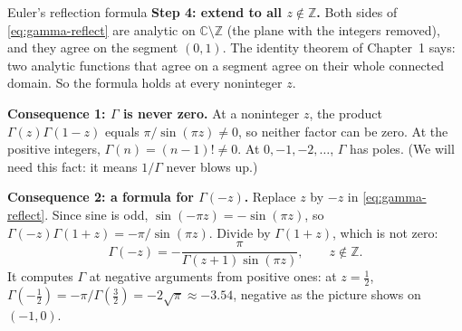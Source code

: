 \documentclass[11pt]{beamer}
\begin{document}
\begin{frame}[allowframebreaks=1.00]{Euler's reflection formula}
\textbf{Step 4: extend to all \(z\notin\mathbb Z\).} Both sides of \eqref{eq:gamma-reflect} are
analytic on \(\mathbb C\setminus\mathbb Z\) (the plane with the integers removed), and they agree
on the segment \((0,1)\). The identity theorem of Chapter~1 says: two analytic functions that
agree on a segment agree on their whole connected domain. So the formula holds at every
noninteger \(z\).
\par\framebreak\par
\textbf{Consequence 1: \(\Gamma\) is never zero.} At a noninteger \(z\), the product
\(\Gamma(z)\Gamma(1-z)\) equals \(\pi/\sin(\pi z)\neq0\), so neither factor can be zero. At the
positive integers, \(\Gamma(n)=(n-1)!\neq0\). At \(0,-1,-2,\dots\), \(\Gamma\) has poles.
(We will need this fact: it means \(1/\Gamma\) never blows up.)

\textbf{Consequence 2: a formula for \(\Gamma(-z)\).} Replace \(z\) by \(-z\) in
\eqref{eq:gamma-reflect}. Since sine is odd, \(\sin(-\pi z)=-\sin(\pi z)\), so
\(\Gamma(-z)\Gamma(1+z)=-\pi/\sin(\pi z)\). Divide by \(\Gamma(1+z)\), which is not zero:
\begin{equation}
 \Gamma(-z)=-\frac{\pi}{\Gamma(z+1)\sin(\pi z)},\qquad z\notin\mathbb Z.
 \label{eq:gamma-neg}
\end{equation}
It computes \(\Gamma\) at negative arguments from positive ones: at \(z=\tfrac12\),
\(\Gamma(-\tfrac12)=-\pi/\Gamma(\tfrac32)=-2\sqrt\pi\approx-3.54\), negative as the picture shows on \((-1,0)\).
\end{frame}
\end{document}
